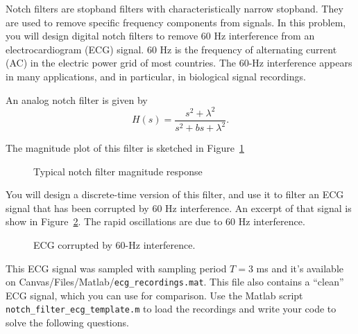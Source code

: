 \documentclass[12pt]{report}
\begin{document}
\newpage
{}

Notch filters are stopband filters with characteristically narrow stopband. They are used to remove specific frequency components from signals. In this problem, you will design digital notch filters to remove 60 Hz interference from an electrocardiogram (ECG) signal. 60 Hz is the frequency of alternating current (AC) in the electric power grid of most countries. The 60-Hz interference appears in many applications, and in particular, in biological signal recordings.

An analog notch filter is given by
\begin{equation} \label{eq:analog-notch-filter}
H(s) = \frac{s^2 + \lambda^2}{s^2 + bs + \lambda^2}.
\end{equation}

The magnitude plot of this filter is sketched in Figure~\ref{fig:notch_filter_mag}

\begin{figure}[h!]
	\centering
	\resizebox{0.45\textwidth}{!}{}
	\caption{Typical notch filter magnitude response}
	\label{fig:notch_filter_mag}
\end{figure}

You will design a discrete-time version of this filter, and use it to filter an ECG signal that has been corrupted by 60 Hz interference. An excerpt of that signal is show in Figure~\ref{fig:sample_ecg}. The rapid oscillations are due to 60 Hz interference.

\FloatBarrier
\begin{figure}
	\centering
	\resizebox{0.9\textwidth}{!}{}
	\caption{ECG corrupted by 60-Hz interference.}
	\label{fig:sample_ecg}
\end{figure}
\FloatBarrier

This ECG signal was sampled with sampling period $T = 3$ ms and it's available on Canvas/Files/Matlab/\texttt{ecg\_recordings.mat}. This file also contains a ``clean'' ECG signal, which you can use for comparison. Use the Matlab script \texttt{notch\_filter\_ecg\_template.m} to load the recordings and write your code to solve the following questions.
\end{document}
